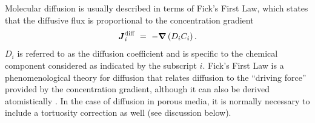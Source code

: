 Molecular diffusion is usually described in terms of Fick's First Law, which states that the diffusive flux is proportional to the concentration gradient
\begin{equation} \label{eq:FicksFirstLaw} 
\boldsymbol{J}_{i}^\text{diff} \ =\  -\boldsymbol{\nabla} \left( D_{i} C_{i} \right).  
\end{equation} 
$D_i$ is referred to as the diffusion coefficient and is specific to the chemical component considered as indicated by the subscript $i$.  Fick's First Law is a phenomenological theory for diffusion that relates diffusion to the ``driving force'' provided by the concentration gradient, although it can also be derived atomistically \citep{lasaga1998kinetic}.   In the case of diffusion in porous media, it is normally necessary to include a tortuosity correction as well (see discussion below).  

